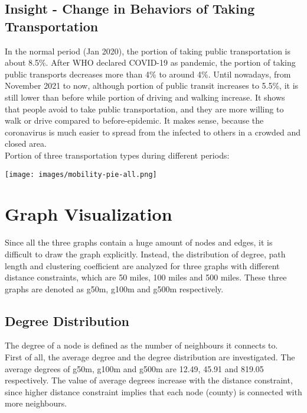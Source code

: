 \subsection{Insight - Change in Behaviors of Taking Transportation}
In the normal period (Jan 2020), the portion of taking public transportation is about 8.5\%. After WHO declared COVID-19 as pandemic, the portion of taking public transports decreases more than 4\% to around 4\%. Until nowadays, from November 2021 to now, although portion of public transit increases to 5.5\%, it is still lower than before while portion of driving and walking increase. It shows that people avoid to take public transportation, and they are more willing to walk or drive compared to before-epidemic. It makes sense, because the coronavirus is much easier to spread from the infected to others in a crowded and closed area.\\

Portion of three transportation types during different periods:

\texttt{[image: images/mobility-pie-all.png]}\\


\section{Graph Visualization}
Since all the three graphs contain a huge amount of nodes and edges, it is difficult to draw the graph explicitly. Instead, the distribution of degree, path length and clustering coefficient are analyzed for three graphs with different distance constraints, which are 50 miles, 100 miles and 500 miles. These three graphs are denoted as g50m, g100m and g500m respectively. 

\subsection{Degree Distribution}
The degree of a node is defined as the number of neighbours it connects to.\\

First of all, the average degree and the degree distribution are investigated. The average degrees of g50m, g100m and g500m are 12.49, 45.91 and 819.05 respectively. The value of average degrees increase with the distance constraint, since higher distance constraint implies that each node (county) is connected with more neighbours. \\


